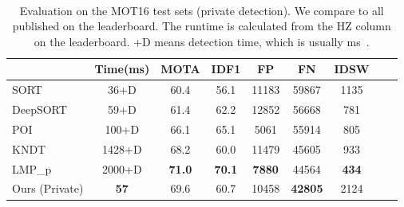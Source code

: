 \documentclass[runningheads]{llncs}
\newcommand{\lbltab}[1]{\label{tbl:#1}}
\begin{document}
\begin{table}[b]
\center \
\begin{tabular}{@{}l@{}c@{\ } c@{\ } c@{\ } c@{\ } c@{\ } c@{\ } c@{\ } c@{}}
\toprule
 & Time(ms) & MOTA  & IDF1  & FP  & FN  & IDSW \\
\midrule
SORT~\cite{Bewley2016_sort} & 36+D & 60.4 & 56.1  & 11183 & 59867 & 1135 \\
DeepSORT~\cite{Wojke2017simple} & 59+D & 61.4 & 62.2  & 12852 & 56668 & 781\\
POI~\cite{yu2016poi} & 100+D & 66.1 & 65.1 & 5061 & 55914 & 805 \\
KNDT~\cite{yu2016poi} & 1428+D & 68.2 & 60.0 & 11479 & 45605 & 933 \\	
LMP\_p ~\cite{tang2017multiple} & 2000+D & \textbf{71.0} & \textbf{70.1} & \textbf{7880} & 44564 & \textbf{434} \\	
Ours (Private) & \textbf{57} & 69.6 & 60.7 & 10458 & \textbf{42805} & 2124 \\
\bottomrule
\end{tabular}
\normalsize
\caption{Evaluation on the MOT16 test sets (private detection). We compare to all published on the leaderboard. The runtime is calculated from the {HZ} column on the leaderboard. +D means detection time, which is usually ms~\cite{ren2015faster}.}
\lbltab{sota:MOT}
\end{table}
\end{document}

